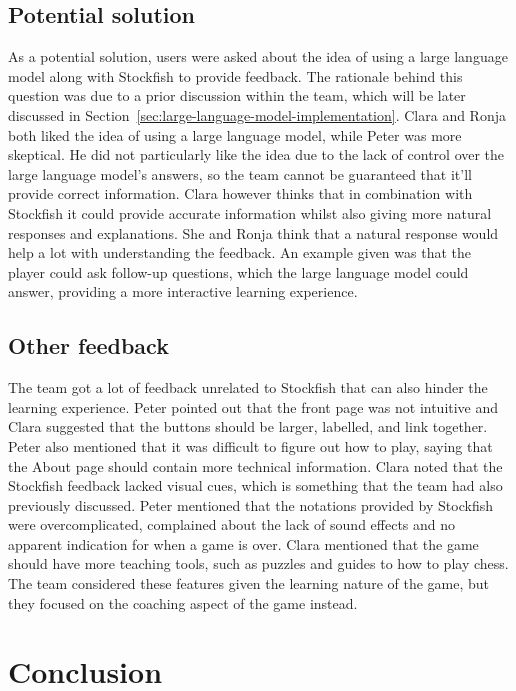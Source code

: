 \subsection{Potential solution}\label{subsec:potential-solution}

As a potential solution, users were asked about the idea of using a large language model along with Stockfish to provide
feedback.
The rationale behind this question was due to a prior discussion within the team, which will be later discussed in
Section~\ref{sec:large-language-model-implementation}.
Clara and Ronja both liked the idea of using a large language model, while Peter was more skeptical.
He did not particularly like the idea due to the lack of control over the large language model's answers, so the team
cannot be guaranteed that it'll provide correct information.
Clara however thinks that in combination with Stockfish it could provide accurate information whilst also giving more
natural responses and explanations.
She and Ronja think that a natural response would help a lot with understanding the feedback.
An example given was that the player could ask follow-up questions, which the large language model could answer,
providing a more interactive learning experience.

\subsection{Other feedback}\label{subsec:other-feedback}

The team got a lot of feedback unrelated to Stockfish that can also hinder the learning experience.
Peter pointed out that the front page was not intuitive and Clara suggested that the buttons should be larger, labelled,
and link together.
Peter also mentioned that it was difficult to figure out how to play, saying that the About page should contain
more technical information.
Clara noted that the Stockfish feedback lacked visual cues, which is something that the team had also previously
discussed.
Peter mentioned that the notations provided by Stockfish were overcomplicated, complained about the lack of sound
effects and no apparent indication for when a game is over.
Clara mentioned that the game should have more teaching tools, such as puzzles and guides to how to play chess.
The team considered these features given the learning nature of the game, but they focused on the coaching aspect of the
game instead.

\section{Conclusion}\label{sec:tests-conclusion}

